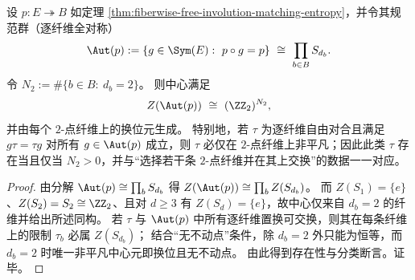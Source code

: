\begin{corollary}[规范群中心中的二值跳跃与 $2$-挠元]\label{cor:autp-center-z2-by-twofibers}
设 \(p:E\twoheadrightarrow B\) 如定理 \ref{thm:fiberwise-free-involution-matching-entropy}，并令其规范群（逐纤维全对称）
\[
\Aut(p):=\{g\in\Sym(E):\ p\circ g=p\}\ \cong\ \prod_{b\in B} S_{d_b}.
\]
令 \(N_2:=\#\{b\in B:\ d_b=2\}\)。
则中心满足
\[
Z(\Aut(p))\ \cong\ (\ZZ_2)^{N_2},
\]
并由每个 \(2\)-点纤维上的换位元生成。
特别地，若 \(\tau\) 为逐纤维自由对合且满足 \(g\tau=\tau g\) 对所有 \(g\in\Aut(p)\) 成立，则 \(\tau\) 必仅在 \(2\)-点纤维上非平凡；因此此类 \(\tau\) 存在当且仅当 \(N_2>0\)，并与“选择若干条 \(2\)-点纤维并在其上交换”的数据一一对应。
\end{corollary}
\begin{proof}
由分解 \(\Aut(p)\cong \prod_b S_{d_b}\) 得 \(Z(\Aut(p))\cong\prod_b Z(S_{d_b})\)。
而 \(Z(S_1)=\{e\}\)、\(Z(S_2)=S_2\cong\ZZ_2\)、且对 \(d\ge 3\) 有 \(Z(S_d)=\{e\}\)，故中心仅来自 \(d_b=2\) 的纤维并给出所述同构。
若 \(\tau\) 与 \(\Aut(p)\) 中所有逐纤维置换可交换，则其在每条纤维上的限制 \(\tau_b\) 必属 \(Z(S_{d_b})\)；
结合“无不动点”条件，除 \(d_b=2\) 外只能为恒等，而 \(d_b=2\) 时唯一非平凡中心元即换位且无不动点。
由此得到存在性与分类断言。证毕。
\end{proof}
